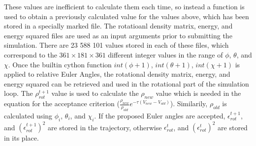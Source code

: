 \documentclass[11pt]{article}
\begin{document}
These values are inefficient to calculate them each time, so instead a function is used to obtain a previously calculated value for the values above, which has been stored in a specially marked file. The rotatioanl density matrix, energy, and energy squared files are used as an input arguments prior to submitting the simulation. There are 23 588 101 values stored in each of these files, which correspond to the \begin{math} 361 \times 181 \times 361 \end{math} different integer values in the range of \begin{math} \phi \end{math}, \begin{math} \theta \end{math}, and \begin{math} \chi\end{math}. Once the builtin cython function \begin{math} int( \phi + 1 ) \end{math}, \begin{math} int( \theta + 1 ) \end{math}, \begin{math} int( \chi + 1 ) \end{math}  is applied to relative Euler Angles, the rotational density matrix, energy, and energy squared can be retrieved and used in the rotational part of the simulation loop. The \begin{math} \rho_{rot}^{t+1} \end{math} value is used to calculate the \begin{math} \rho_{new} \end{math} value which is needed in the equation for the acceptance criterion (\begin{math} \frac{\rho_{new}}{\rho_{old}} e^{- \tau ( V_{new} - V_{old} )} \end{math}). Similarily, \begin{math} \rho_{old} \end{math} is calculated using \begin{math} \phi_{i} \end{math}, \begin{math} \theta_{i} \end{math}, and \begin{math} \chi_{i} \end{math}. If the proposed Euler angles are accepted, \begin{math} \epsilon_{rot}^{t+1} \end{math}, and \begin{math} ( \epsilon_{rot}^{t+1} )^2 \end{math} are stored in the trajectory, otherwise \begin{math} \epsilon_{rot}^{t} \end{math}, and \begin{math} ( \epsilon_{rot}^{t} )^2 \end{math} are stored in its place. 
\end{document}
